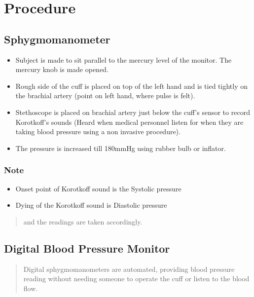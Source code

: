 \documentclass[
  11pt,
  letterpaper,
  DIV=11,
  numbers=noendperiod]{scrreprt}
\begin{document}
\section{Procedure}\label{procedure}

\subsection{Sphygmomanometer}\label{sphygmomanometer-1}

\begin{itemize}
\item
  Subject is made to sit parallel to the mercury level of the monitor.
  The mercury knob is made opened.
\item
  Rough side of the cuff is placed on top of the left hand and is tied
  tightly on the brachial artery (point on left hand, where pulse is
  felt).
\item
  Stethoscope is placed on brachial artery just below the cuff's sensor
  to record Korotkoff's sounds (Heard when medical personnel listen for
  when they are taking blood pressure using a non invasive procedure).
\item
  The pressure is increased till 180mmHg using rubber bulb or inflator.
\end{itemize}

\subsubsection{Note}\label{note}

\begin{itemize}
\item
  Onset point of Korotkoff sound is the Systolic pressure
\item
  Dying of the Korotkoff sound is Diastolic pressure
\end{itemize}

\begin{quote}
and the readings are taken accordingly.
\end{quote}

\subsection{Digital Blood Pressure
Monitor}\label{digital-blood-pressure-monitor}

\begin{quote}
Digital sphygmomanometers are automated, providing blood pressure
reading without needing someone to operate the cuff or listen to the
blood flow.
\end{quote}
\end{document}
